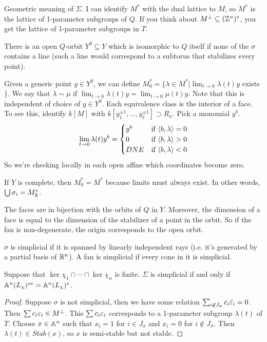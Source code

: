 Geometric meaning of $\Sigma$. I can identify $M^*$ with the dual lattice to $M$, so $M^*$ is the lattice of 1-parameter subgroups of $Q$. If you think about $M^\perp\subseteq (\ZZ^n)^*$, you get the lattice of 1-parameter subgroups in $T$.

There is an open $Q$-orbit $Y^0\subseteq Y$ which is isomorphic to $Q$ itself if none of the $\sigma$ contains a line (such a line would correspond to a subtorus that stabilizes every point). 

Given a generic point $y\in Y^0$, we can define $M^*_0=\{\lambda\in M^*|\lim_{t\to 0}\lambda(t)y$ exists$\}$. We say that $\lambda\sim\mu$ if $\lim_{t\to 0} \lambda(t)y=\lim_{t\to 0}\mu(t)y$. Note that this is independent of choice of $y\in Y^0$. Each equivalence class is the interior of a face. To see this, identify $k[M]$ with $k[y_1^{\pm1},\dots, y_\ell^{\pm 1}]\supset R_\sigma$. Pick a monomial $y^b$.
\[
 \lim_{t\to 0} \lambda(t)y^b = 
 \begin{cases}
  y^b & \text{if }\<b,\lambda\>=0\\
  0 & \text{if }\<b,\lambda\>>0\\
  DNE & \text{if }\<b,\lambda\><0\\
 \end{cases}
\]
So we're checking locally in each open affine which coordinates become zero.

If $Y$ is complete, then $M_0^*=M^*$ because limits must always exist. In other words, $\bigcup \sigma_i=M^*_\RR$.

\begin{corollary}
 The faces are in bijection with the orbits of $Q$ in $Y$. Moreover, the dimension of a face is equal to the dimension of the stabilizer of a point in the orbit. So if the fan is non-degenerate, the origin corresponds to the open orbit.
\end{corollary}
$\sigma$ is simplicial if it is spanned by linearly independent rays (i.e. it's generated by a partial basis of $\RR^n$). A fan is simplicial if every cone in it is simplicial.
\begin{proposition}
 Suppose that $\ker\chi_1\cap\cdots\cap \ker\chi_n$ is finite. $\Sigma$ is simplicial if and only if $\AA^n(L_\chi)^{ss}=\AA^n(L_\chi)^s$.
\end{proposition}
\begin{proof}
 Suppose $\sigma$ is not simplicial, then we have some relation $\sum_{i\not\in J_\sigma} c_i\bar\e_i=0$. Then $\sum c_i\e_i\in M^\perp$. This $\sum c_i \e_i$ corresponds to a 1-parameter subgroup $\lambda(t)$ of $T$. Choose $x\in \AA^n$ such that $x_i=1$ for $i\in J_\sigma$ and $x_i=0$ for $i\not\in J_\sigma$. Then $\lambda(t)\in Stab(x)$, so $x$ is semi-stable but not stable.
\end{proof}
